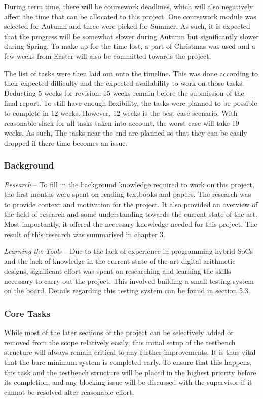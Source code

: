 During term time, there will be coursework deadlines, which will also
negatively affect the time that can be allocated to this project.
One coursework module was selected for Autumn and three were picked for Summer.
As such, it is expected that the progress will be somewhat slower during Autumn
but significantly slower during Spring.
To make up for the time lost, a part of Christmas was used and a few weeks
from Easter will also be committed towards the project.

The list of tasks were then laid out onto the timeline.
This was done according to their expected difficulty and the expected
availability to work on those tasks.
Deducting 5 weeks for revision, 15 weeks remain before the submission of the
final report.
To still have enough flexibility, the tasks were planned to be possible to
complete in 12 weeks.
However, 12 weeks is the best case scenario.
With reasonable slack for all tasks taken into account, the worst case will
take 19 weeks.
As such, The tasks near the end are planned so that they can be easily dropped
if there time becomes an issue.

\subsubsection{\textbf{Background}}

\textit{Research} --
To fill in the background knowledge required to work on this project, the first
months were spent on reading textbooks and papers.
The research was to provide context and motivation for the project.
It also provided an overview of the field of research and some understanding
towards the current state-of-the-art.
Most importantly, it offered the necessary knowledge needed for this project.
The result of this research was summarised in chapter 3.

\textit{Learning the Tools} --
Due to the lack of experience in programming hybrid SoCs and the lack of
knowledge in the current state-of-the-art digital arithmetic designs,
significant effort was spent on researching and learning the skills
necessary to carry out the project.
This involved building a small testing system on the board.
Details regarding this testing system can be found in section 5.3.

\subsubsection{\textbf{Core Tasks}}

While most of the later sections of the project can be selectively added or
removed from the scope relatively easily, this initial setup of the testbench
structure will always remain critical to any further improvements.
It is thus vital that the bare minimum system is completed early.
To ensure that this happens, this task and the testbench structure will be
placed in the highest priority before its completion, and any blocking issue
will be discussed with the supervisor if it cannot be resolved after reasonable
effort.

